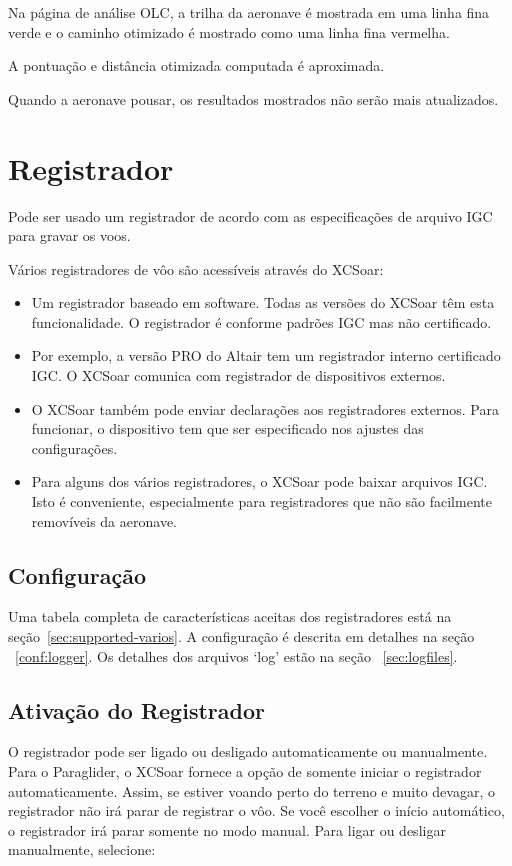 Na página de análise OLC, a trilha da aeronave é mostrada em uma linha fina verde e o caminho otimizado é mostrado como uma linha fina vermelha.

A pontuação e distância otimizada computada é aproximada.

Quando a aeronave pousar, os resultados mostrados não serão mais atualizados.



\section{Registrador}\label{sec:logger}

Pode ser usado um registrador de acordo com as especificações de arquivo IGC para gravar os voos.

Vários registradores de vôo são acessíveis através do XCSoar:

\begin{itemize}
\item Um registrador baseado em software.  Todas as versões do XCSoar têm esta funcionalidade.  O registrador é conforme padrões IGC mas não certificado. 
\item Por exemplo, a versão PRO do Altair tem um registrador interno certificado IGC.  O XCSoar comunica com registrador de dispositivos externos.
\item O XCSoar também pode enviar declarações aos registradores externos.  Para funcionar, o dispositivo tem que ser especificado nos ajustes das configurações.
\item  Para alguns dos vários registradores, o XCSoar pode baixar arquivos IGC.  Isto é conveniente, especialmente para registradores que não são facilmente removíveis da aeronave.  
\end{itemize}

\subsection*{Configuração}
Uma tabela completa de características aceitas dos registradores está na seção~\ref{sec:supported-varios}.
A configuração é descrita em detalhes na seção ~\ref{conf:logger}.  Os detalhes dos arquivos ‘log’ estão na seção ~\ref{sec:logfiles}.

\subsection*{Ativação do Registrador}
O registrador pode ser ligado ou desligado automaticamente ou manualmente.  Para o Paraglider, o XCSoar fornece a opção de somente iniciar o registrador automaticamente. Assim, se estiver voando perto do terreno e muito devagar, o registrador não irá parar de registrar o vôo.  Se você escolher o início automático, o registrador irá parar somente no modo manual.  Para ligar ou desligar manualmente, selecione:
\begin{quote}
\blink{}
\end{quote}

